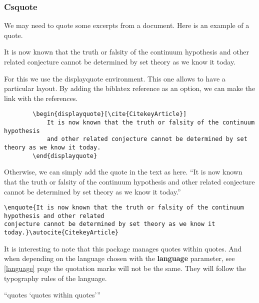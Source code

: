 \subsubsection{Csquote}
We may need to quote some excerpts from a document. Here is an example of a quote.
\begin{displayquote}
    It is now known that the truth or falsity of the continuum hypothesis
    and other related conjecture cannot be determined by set theory as we know it today.
\end{displayquote}

For this we use the displayquote environment. This one allows to have a particular layout.
By adding the biblatex reference as an option, we can make the link with the references.
\begin{code}
    \begin{verbatim}
        \begin{displayquote}[\cite{CitekeyArticle}]
            It is now known that the truth or falsity of the continuum hypothesis
            and other related conjecture cannot be determined by set theory as we know it today.
        \end{displayquote}
\end{verbatim}
    \caption{Use of displayquote}
\end{code}
Otherwise, we can simply add the quote in the text as here. \enquote{It is now known that the truth
    or falsity of the continuum hypothesis and other related conjecture cannot be determined by set
    theory as we know it today.}\autocite{CitekeyArticle}
\begin{code}
    \begin{verbatim}
\enquote{It is now known that the truth or falsity of the continuum hypothesis and other related
conjecture cannot be determined by set theory as we know it today.}\autocite{CitekeyArticle}
\end{verbatim}
    \caption{Use of enquote}
\end{code}

It is interesting to note that this package manages quotes within quotes.
And when depending on the language chosen with the \textbf{language} parameter, see \ref{language}
page \pageref{language} the quotation marks will not be the same. They will follow the typography
rules of the language.

\enquote{quotes \enquote{quotes within quotes}}

